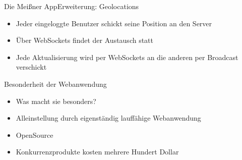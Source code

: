 \begin{frame}{Die Meißner App}{Erweiterung: Geolocations}
	\begin{itemize}
		\item Jeder eingeloggte Benutzer schickt seine Position an den Server
		\item Über WebSockets findet der Austausch statt
		\item Jede Aktualisierung wird per WebSockets an die anderen per Broadcast verschickt
	\end{itemize}
\end{frame}

\begin{frame}{Besonderheit der Webanwendung}
	\begin{itemize}
		\item Was macht sie besonders?
		\item Alleinstellung durch eigenständig lauffähige Webanwendung
		\item OpenSource
		\item Konkurrenzprodukte kosten mehrere Hundert Dollar
	\end{itemize}
\end{frame}